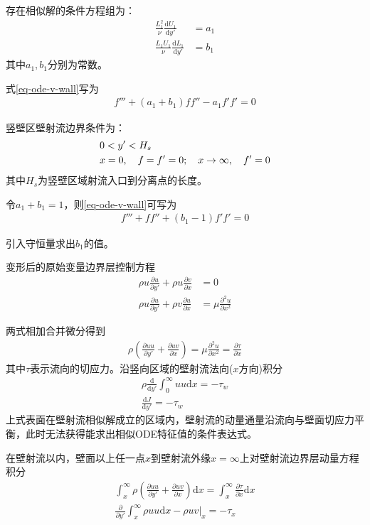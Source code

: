存在相似解的条件方程组为：
\begin{align}
    \frac{L_{1}^{2}}{\nu}\frac{\mathrm{d}U_{1}}{\mathrm{d}y'}&=a_{1}\\
    \frac{L_{1}U_{1}}{\nu}\frac{\mathrm{d}L_{1}}{\mathrm{d}y'}&=b_{1}
\end{align}
其中$a_{1},b_{1}$分别为常数。

式\ref{eq-ode-v-wall}写为
\begin{align}
    f'''+(a_{1}+b_{1})ff''-a_{1}f'f'=0
\end{align}

竖壁区壁射流边界条件为：
\begin{align}
    &0<y'<H_{s}\notag\\
    &x=0,\quad f=f'=0; \quad x\rightarrow \infty,\quad f'=0
\end{align}
其中$H_{s}$为竖壁区域射流入口到分离点的长度。

令$a_{1}+b_{1}=1$，则\ref{eq-ode-v-wall}可写为
\begin{align}
    f'''+ff''+(b_{1}-1)f'f'=0
\end{align}

引入守恒量求出$b_{1}$的值。

变形后的原始变量边界层控制方程
\begin{align}
    \rho u\frac{\partial u}{\partial y'}+\rho u\frac{\partial v}{\partial x}&=0\\
    \rho u\frac{\partial u}{\partial y'}+\rho v\frac{\partial u}{\partial x}&=\mu\frac{\partial^{2}u}{\partial x^{2}}
\end{align}

两式相加合并微分得到
\begin{align}
    \rho\left(\frac{\partial uu}{\partial y'}+\frac{\partial uv}{\partial x}\right)=\mu\frac{\partial^{2}u}{\partial x^{2}}=\frac{\partial \tau}{\partial x}
\end{align}
其中$\tau$表示流向的切应力。沿竖向区域的壁射流法向($x$方向)积分
\begin{align}
    \rho\frac{\mathrm{d}}{\mathrm{d}y'}\int_{0}^{\infty}uu\mathrm{d}x=-\tau_{w}\\
    \frac{\mathrm{d}J}{\mathrm{d}y'}=-\tau_{w}
\end{align}
上式表面在壁射流相似解成立的区域内，壁射流的动量通量沿流向与壁面切应力平衡，此时无法获得能求出相似ODE特征值的条件表达式。

在壁射流以内，壁面以上任一点$x$到壁射流外缘$x=\infty$上对壁射流边界层动量方程积分
\begin{align}
    \int_{x}^{\infty}\rho\left(\frac{\partial uu}{\partial y'}+\frac{\partial uv}{\partial x}\right)\mathrm{d}x=\int_{x}^{\infty}\frac{\partial \tau}{\partial x}\mathrm{d}x\\
    \frac{\partial }{\partial y'}\int_{x}^{\infty}\rho uu\mathrm{d}x-\rho uv|_{x}=-\tau_{x}
\end{align}

